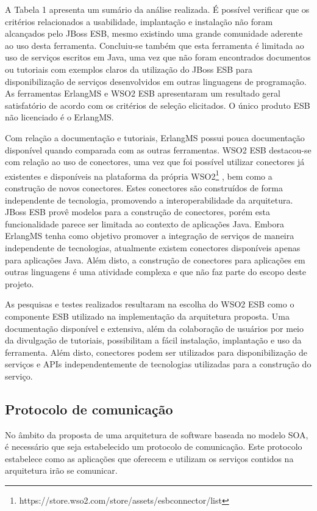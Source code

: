 A Tabela 1 apresenta um sumário da análise realizada. É possível verificar que os critérios relacionados a usabilidade, implantação e instalação não foram alcançados pelo JBoss ESB, mesmo existindo uma grande comunidade aderente ao uso desta ferramenta. Concluiu-se também que esta ferramenta é limitada ao uso de serviços escritos em Java, uma vez que não foram encontrados documentos ou tutoriais com exemplos claros da utilização do JBoss ESB para disponibilização de serviços desenvolvidos em outras linguagens  de programação. As ferramentas ErlangMS e WSO2 ESB apresentaram um resultado geral satisfatório de acordo com os critérios de seleção elicitados. O único produto ESB não licenciado é o ErlangMS.

Com relação a documentação e tutoriais, ErlangMS possui pouca documentação disponível quando comparada com as outras ferramentas. WSO2 ESB destacou-se com relação ao uso de conectores, uma vez que foi possível utilizar conectores já existentes e disponíveis na plataforma da própria WSO2\footnote{https://store.wso2.com/store/assets/esbconnector/list} , bem como a construção de novos conectores. Estes conectores são construídos de forma independente de tecnologia, promovendo a interoperabilidade da arquitetura. JBoss ESB provê modelos para a construção de conectores, porém esta funcionalidade parece ser limitada ao contexto de aplicações Java. Embora ErlangMS tenha como objetivo promover a integração de serviços de maneira independente de tecnologias, atualmente existem conectores disponíveis apenas para aplicações Java. Além disto, a construção de conectores para aplicações em outras linguagens é uma atividade complexa e que  não faz parte do escopo deste projeto.

As pesquisas e testes realizados resultaram na escolha do WSO2 ESB como o componente ESB utilizado na implementação da arquitetura proposta. Uma documentação disponível e extensiva, além da colaboração de usuários por meio da divulgação de tutoriais, possibilitam a fácil instalação, implantação e uso da ferramenta. Além disto, conectores podem ser utilizados para disponibilização de serviços e APIs independentemente de tecnologias utilizadas para a construção do serviço. 

\subsection{Protocolo de comunicação}

No âmbito da proposta de uma arquitetura de software baseada no modelo SOA, é necessário que seja estabelecido um protocolo de comunicação. Este protocolo estabelece como as aplicações que oferecem e utilizam os serviços contidos na arquitetura irão se comunicar.

